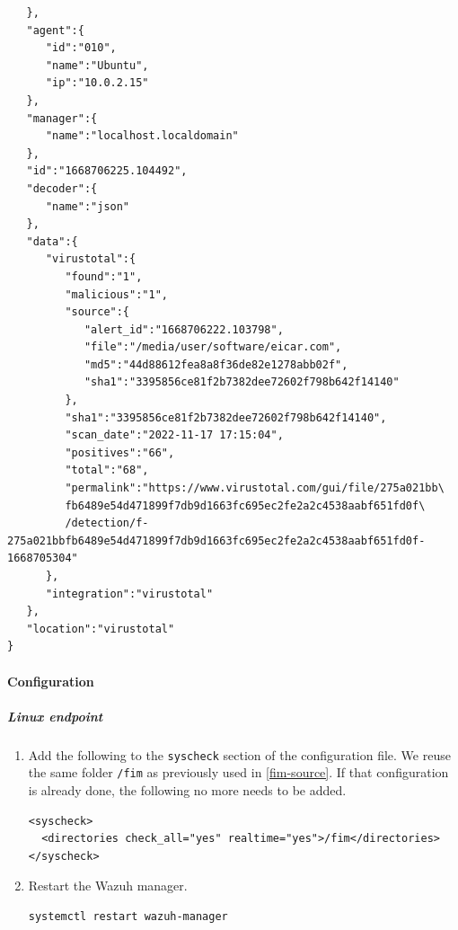 \begin{enumerate}
\begin{itemize}
\begin{verbatim}
   },
   "agent":{
      "id":"010",
      "name":"Ubuntu",
      "ip":"10.0.2.15"
   },
   "manager":{
      "name":"localhost.localdomain"
   },
   "id":"1668706225.104492",
   "decoder":{
      "name":"json"
   },
   "data":{
      "virustotal":{
         "found":"1",
         "malicious":"1",
         "source":{
            "alert_id":"1668706222.103798",
            "file":"/media/user/software/eicar.com",
            "md5":"44d88612fea8a8f36de82e1278abb02f",
            "sha1":"3395856ce81f2b7382dee72602f798b642f14140"
         },
         "sha1":"3395856ce81f2b7382dee72602f798b642f14140",
         "scan_date":"2022-11-17 17:15:04",
         "positives":"66",
         "total":"68",
         "permalink":"https://www.virustotal.com/gui/file/275a021bb\
         fb6489e54d471899f7db9d1663fc695ec2fe2a2c4538aabf651fd0f\
         /detection/f-275a021bbfb6489e54d471899f7db9d1663fc695ec2fe2a2c4538aabf651fd0f-1668705304"
      },
      "integration":"virustotal"
   },
   "location":"virustotal"
}
    \end{verbatim}
    \end{itemize}
\end{enumerate}

\paragraph{Configuration}
\subparagraph{Linux endpoint}
\begin{enumerate}
    \item Add the following to the \texttt{\textlangle syscheck\textrangle} section of the configuration file. We reuse the same folder \texttt{/fim} as previously used in \ref{fim-source}. If that configuration is already done, the following no more needs to be added.
    \begin{verbatim}
<syscheck>
  <directories check_all="yes" realtime="yes">/fim</directories>
</syscheck>
    \end{verbatim}

    \item Restart the Wazuh manager.
    \begin{verbatim}
systemctl restart wazuh-manager
    \end{verbatim}
\end{enumerate}

